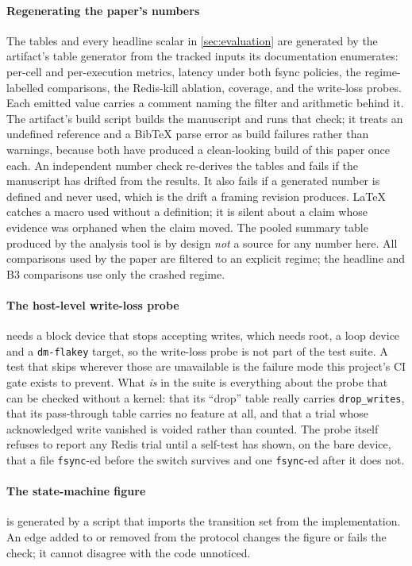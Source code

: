 \paragraph{Regenerating the paper's numbers} The tables and every headline
scalar in \cref{sec:evaluation} are generated by
the artifact's table generator from the tracked inputs its documentation
enumerates: per-cell and per-execution metrics, latency under both
fsync policies, the regime-labelled comparisons, the Redis-kill ablation,
coverage, and the write-loss probes. Each emitted value carries a comment
naming the filter and arithmetic behind it.
The artifact's build script builds the manuscript and runs that
check; it treats an undefined reference and a BibTeX parse error as build
failures rather than warnings, because both have produced a clean-looking
build of this paper once each.
An independent number check re-derives the tables and fails if
the manuscript has drifted from the results. It also fails if a generated
number is defined and never used, which is the drift a framing revision
produces.
LaTeX catches a macro used without a definition; it is silent about a claim
whose evidence was orphaned when the claim moved. The pooled summary table
produced by the analysis tool is by design \emph{not} a source for any
number here. All comparisons used by the paper are filtered to an explicit
regime; the headline and B3 comparisons use only the crashed regime.

\paragraph{The host-level write-loss probe}  needs a
block device that stops accepting writes, which needs root, a loop device and
a \texttt{dm-flakey} target, so the write-loss probe is
not part of the test suite. A test that skips wherever those are
unavailable is the failure mode this project's CI gate exists to prevent. What
\emph{is} in the suite is everything about the probe that can be checked
without a kernel: that its ``drop'' table really carries \texttt{drop\_writes},
that its pass-through table carries no feature at all, and that a trial whose
acknowledged write vanished is voided rather than counted. The probe itself
refuses to report any Redis trial until a self-test has shown, on the bare
device, that a file \texttt{fsync}-ed before the switch survives and one
\texttt{fsync}-ed after it does not.

\paragraph{The state-machine figure}  is generated by a script
that imports the transition set from the implementation. An edge added to or removed from the protocol changes the
figure or fails the check; it cannot disagree with the code unnoticed.

